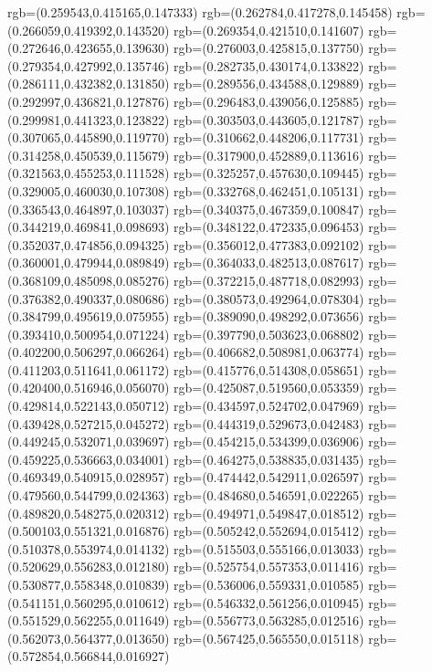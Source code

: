 {{{			rgb=(0.259543,0.415165,0.147333)
			rgb=(0.262784,0.417278,0.145458)
			rgb=(0.266059,0.419392,0.143520)
			rgb=(0.269354,0.421510,0.141607)
			rgb=(0.272646,0.423655,0.139630)
			rgb=(0.276003,0.425815,0.137750)
			rgb=(0.279354,0.427992,0.135746)
			rgb=(0.282735,0.430174,0.133822)
			rgb=(0.286111,0.432382,0.131850)
			rgb=(0.289556,0.434588,0.129889)
			rgb=(0.292997,0.436821,0.127876)
			rgb=(0.296483,0.439056,0.125885)
			rgb=(0.299981,0.441323,0.123822)
			rgb=(0.303503,0.443605,0.121787)
			rgb=(0.307065,0.445890,0.119770)
			rgb=(0.310662,0.448206,0.117731)
			rgb=(0.314258,0.450539,0.115679)
			rgb=(0.317900,0.452889,0.113616)
			rgb=(0.321563,0.455253,0.111528)
			rgb=(0.325257,0.457630,0.109445)
			rgb=(0.329005,0.460030,0.107308)
			rgb=(0.332768,0.462451,0.105131)
			rgb=(0.336543,0.464897,0.103037)
			rgb=(0.340375,0.467359,0.100847)
			rgb=(0.344219,0.469841,0.098693)
			rgb=(0.348122,0.472335,0.096453)
			rgb=(0.352037,0.474856,0.094325)
			rgb=(0.356012,0.477383,0.092102)
			rgb=(0.360001,0.479944,0.089849)
			rgb=(0.364033,0.482513,0.087617)
			rgb=(0.368109,0.485098,0.085276)
			rgb=(0.372215,0.487718,0.082993)
			rgb=(0.376382,0.490337,0.080686)
			rgb=(0.380573,0.492964,0.078304)
			rgb=(0.384799,0.495619,0.075955)
			rgb=(0.389090,0.498292,0.073656)
			rgb=(0.393410,0.500954,0.071224)
			rgb=(0.397790,0.503623,0.068802)
			rgb=(0.402200,0.506297,0.066264)
			rgb=(0.406682,0.508981,0.063774)
			rgb=(0.411203,0.511641,0.061172)
			rgb=(0.415776,0.514308,0.058651)
			rgb=(0.420400,0.516946,0.056070)
			rgb=(0.425087,0.519560,0.053359)
			rgb=(0.429814,0.522143,0.050712)
			rgb=(0.434597,0.524702,0.047969)
			rgb=(0.439428,0.527215,0.045272)
			rgb=(0.444319,0.529673,0.042483)
			rgb=(0.449245,0.532071,0.039697)
			rgb=(0.454215,0.534399,0.036906)
			rgb=(0.459225,0.536663,0.034001)
			rgb=(0.464275,0.538835,0.031435)
			rgb=(0.469349,0.540915,0.028957)
			rgb=(0.474442,0.542911,0.026597)
			rgb=(0.479560,0.544799,0.024363)
			rgb=(0.484680,0.546591,0.022265)
			rgb=(0.489820,0.548275,0.020312)
			rgb=(0.494971,0.549847,0.018512)
			rgb=(0.500103,0.551321,0.016876)
			rgb=(0.505242,0.552694,0.015412)
			rgb=(0.510378,0.553974,0.014132)
			rgb=(0.515503,0.555166,0.013033)
			rgb=(0.520629,0.556283,0.012180)
			rgb=(0.525754,0.557353,0.011416)
			rgb=(0.530877,0.558348,0.010839)
			rgb=(0.536006,0.559331,0.010585)
			rgb=(0.541151,0.560295,0.010612)
			rgb=(0.546332,0.561256,0.010945)
			rgb=(0.551529,0.562255,0.011649)
			rgb=(0.556773,0.563285,0.012516)
			rgb=(0.562073,0.564377,0.013650)
			rgb=(0.567425,0.565550,0.015118)
			rgb=(0.572854,0.566844,0.016927)
}}}
